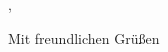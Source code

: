 \documentclass[version=last]{scrlttr2}
\begin{document}
	\begin{letter}{}
		\opening{,}

		\closing{Mit freundlichen Grüßen}
	\end{letter}
\end{document}
